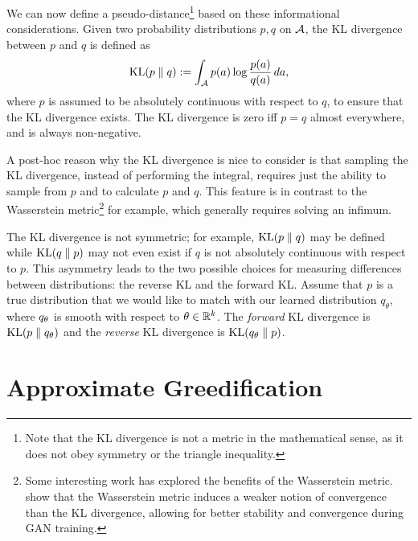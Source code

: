 \documentclass[\main/thesis.tex]{subfiles}
\begin{document}
We can now define a pseudo-distance\footnote{Note that the KL divergence is not a metric in the mathematical sense, as it does not obey symmetry or the triangle inequality.} based on these informational considerations. Given two probability distributions $p, q$ on $\mathcal{A}$, the KL divergence between $p$ and $q$ is defined as 
\begin{equation*}
  \mathrm{KL}(p \parallel q) := \int_{\mathcal{A}} p(a) \log\frac{p(a)}{q(a)}\, da  ,
\end{equation*}
%
where $p$ is assumed to be {absolutely continuous} \citep{billingsley2008probability} with respect to $q$, to ensure that the KL divergence exists. The KL divergence is zero iff $p = q$ almost everywhere, and is always non-negative.
%

A post-hoc reason why the KL divergence is nice to consider is that sampling the KL divergence, instead of performing the integral, requires just the ability to sample from $p$ and to calculate $p$ and $q$. This feature is in contrast to the Wasserstein metric\footnote{Some interesting work has explored the benefits of the Wasserstein metric. \citep{arjovsky2017wasserstein} show that the Wasserstein metric induces a weaker notion of convergence than the KL divergence, allowing for better stability and convergence during GAN training. } for example, which generally requires solving an infimum. 

The KL divergence is not symmetric; for example, $\mathrm{KL}(p \parallel q)$ may be defined while $\mathrm{KL}(q \parallel p)$ may not even exist if $q$ is not absolutely continuous with respect to $p$. This asymmetry leads to the two possible choices for measuring differences between distributions: the reverse KL and the forward KL. Assume that $p$ is a true distribution that we would like to match with our learned distribution $q_\theta$, where  $q_\theta$ is smooth with respect to $\theta \in \mathbb{R}^k$. The \textit{forward} KL divergence is $\mathrm{KL}(p \parallel q_\theta)$ and the \textit{reverse} KL divergence is $\mathrm{KL}(q_\theta \parallel p)$. 

\section{Approximate Greedification}\label{sec:greedification}
\end{document}
